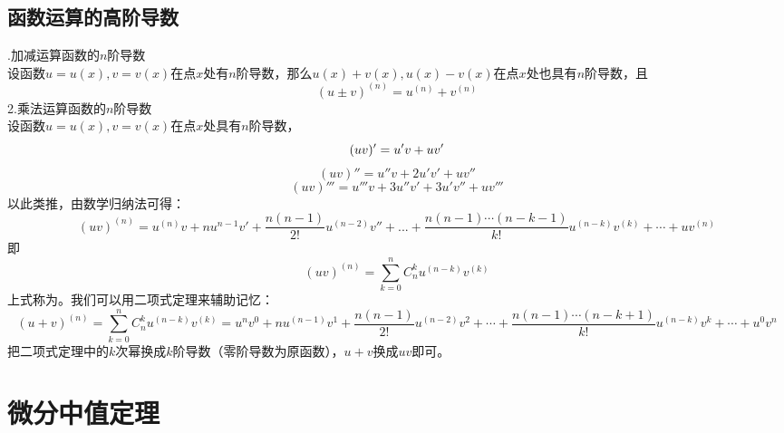 \subsection{函数运算的高阶导数}
.\enspace 加减运算函数的$n$阶导数\\
\kg 设函数$u=u(x),v=v(x)$在点$x$处有$n$阶导数，那么$u(x)+v(x),u(x)-v(x)$在点$x$处也具有$n$阶导数，且
\begin{equation}
	(u\pm v)^{(n)}=u^{(n)}+v^{(n)}
\end{equation}
2.\enspace 乘法运算函数的$n$阶导数
\\ \kg 设函数$u=u(x),v=v(x)$在点$x$处具有$n$阶导数，
\begin{equation}
	\nonumber
	(uv)'=u'v+uv'\vspace{-0.3em} 
\end{equation}
\begin{equation}
	\nonumber
	(uv)''=u''v+2u'v'+uv'' 
\end{equation}
\begin{equation}
	\nonumber
	(uv)'''=u'''v+3u''v'+3u'v''+uv'''  
\end{equation}
以此类推，由数学归纳法可得：
\begin{equation}
	(uv)^{(n)}=u^{(n)}v+nu^{n-1}v'+\frac{n(n-1)}{2!}u^{(n-2)}v''+...+\frac{n(n-1)\cdots(n-k-1)}{k!}u^{(n-k)}v^{(k)}+\cdots+uv^{(n)}
\end{equation}
即
\begin{equation}
	(uv)^{(n)}=\sum_{k=0}^{n}C_{n}^{k}u^{(n-k)}v^{(k)}
\end{equation}
上式称为。我们可以用二项式定理来辅助记忆：
\begin{equation}
	(u+v)^{(n)}=\sum_{k=0}^{n}C_n^k u^{(n-k)}v^{(k)}=u^nv^0+nu^{(n-1)}v^1+\frac{n(n-1)}{2!}u^{(n-2)}v^2+\cdots+\frac{n(n-1)\cdots(n-k+1)}{k!}u^{(n-k)}v^k+\cdots+u^0v^n
\end{equation}
把二项式定理中的$k$次幂换成$k$阶导数（零阶导数为原函数），$u+v$换成$uv$即可。
\section{微分中值定理}

